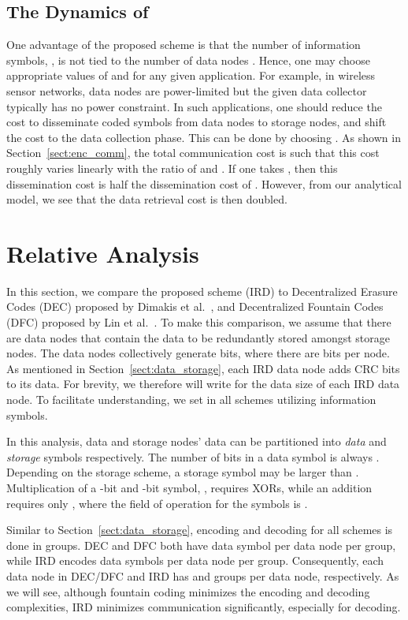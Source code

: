 \documentclass[10pt,journal,letterpaper,compsoc]{IEEEtran}
\newcommand{\0}{{\bf 0}}
\begin{document}
\subsection{The Dynamics of }
\label{sect:dynamic}
One advantage of the proposed scheme is that the number of information symbols, ,
is not tied to the number of data nodes .
Hence, one may choose appropriate values of  and  for any given application. 
For example, in wireless sensor networks, data nodes
are power-limited but the given data collector typically has no power constraint.
In such applications, one should reduce the 
cost to disseminate coded symbols from data nodes to storage nodes,
and shift the cost to the data collection phase. This can be done 
by choosing . As shown in Section~\ref{sect:enc_comm}, the total 
communication cost is
 such that this cost roughly varies 
linearly with the ratio of  and . If one takes , then 
this dissemination cost is half the dissemination cost of . However, from our 
analytical model, we see that the data retrieval cost is then doubled. 
\section{Relative Analysis}
\label{sect:era_comp}
In this section, we compare the proposed scheme (IRD) to Decentralized Erasure Codes
(DEC) proposed by Dimakis et al.~\cite{DIM06}, and Decentralized Fountain Codes (DFC) proposed by Lin et al.~\cite{lin2007dpl}. To make this comparison, we assume
that there are  data nodes that contain
the data to be redundantly stored amongst  storage nodes.  The  data
 nodes collectively generate  bits, where there are  bits per node. As mentioned in Section~\ref{sect:data_storage}, each IRD data node adds  CRC bits to its data. For brevity, we therefore will write  for the data size of each IRD data node. To facilitate understanding,
we set  in all schemes utilizing information symbols.


In this analysis, data  and storage nodes' data can be partitioned into \emph{data} and \emph{storage} symbols respectively. The number of bits in a data symbol is always . Depending on the storage scheme, a storage symbol may be larger than . Multiplication of a -bit and -bit symbol, , requires  XORs, while an addition requires only , where the field of operation for the symbols is . 

Similar to Section~\ref{sect:data_storage}, encoding and decoding for all schemes is done in groups. DEC and DFC both have  data symbol per data node per group, while IRD encodes  data symbols per data node per group. Consequently, each data node in DEC/DFC and IRD has  and  groups per data node, respectively. As we will see, although fountain coding minimizes the encoding and decoding complexities, IRD minimizes 
communication significantly, especially for decoding.
\end{document}
